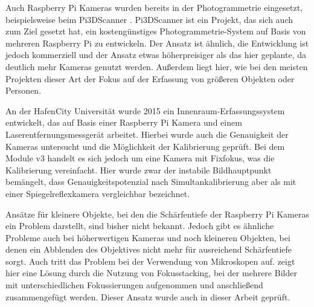 \documentclass[./00PhotoBox]{subfiles}
\begin{document}
Auch Raspberry Pi Kameras wurden bereits in der Photogrammetrie eingesetzt, beispielsweise beim Pi3DScanner \citep{pi3dscanner}. Pi3DScanner ist ein Projekt, das sich auch zum Ziel gesetzt hat, ein kostengünstiges Photo\-gram\-metrie-System auf Basis von mehreren Raspberry Pi zu entwickeln. Der Ansatz ist ähnlich, die Entwicklung ist jedoch kommerziell und der Ansatz etwas höherpreisiger als das hier geplante, da deutlich mehr Kameras genutzt werden. Außerdem liegt hier, wie bei den meisten Projekten dieser Art der Fokus auf der Erfassung von größeren Objekten oder Personen.
\citep{pi3dscanner}

An der HafenCity Universität wurde 2015 ein Innenraum-Erfassungssystem entwickelt, das auf Basis einer Raspberry Pi Kamera und einem Laserentfernungsmessgerät arbeitet. Hierbei wurde auch die Genauigkeit der Kameras untersucht und die Möglichkeit der Kalibrierung geprüft. Bei dem Module v3 handelt es sich jedoch um eine Kamera mit Fixfokus, was die Kalibrierung vereinfacht. Hier wurde zwar der instabile Bildhauptpunkt bemängelt, dass Genauigkeitspotenzial nach Simultankalibrierung aber als mit einer Spiegelreflexkamera vergleichbar bezeichnet.
\citep{3d_raspi_laserscanner}

Ansätze für kleinere Objekte, bei den die Schärfentiefe der Raspberry Pi Kameras ein Problem darstellt, sind bisher nicht bekannt. Jedoch gibt es ähnliche Probleme auch bei höherwertigen Kameras und noch kleineren Objekten, bei denen ein Abblenden des Objektives nicht mehr für ausreichend Schärfentiefe sorgt. Auch tritt das Problem bei der Verwendung von Mikroskopen auf. \cite{focusstack_sfm} zeigt hier eine Lösung durch die Nutzung von Fokusstacking, bei der mehrere Bilder mit unterschiedlichen Fokussierungen aufgenommen und anschließend zusammengefügt werden. Dieser Ansatz wurde auch in dieser Arbeit geprüft.




\biblio
\end{document}
